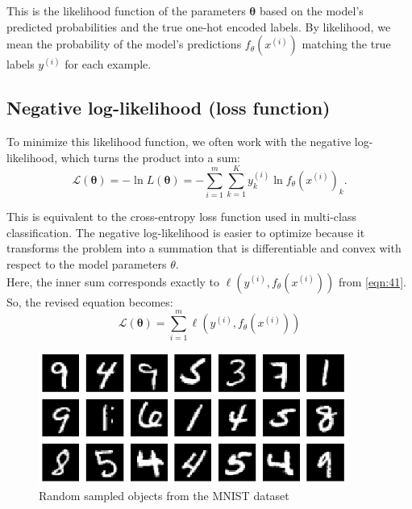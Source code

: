 This is the likelihood function of the parameters $\boldsymbol{\theta}$ based on the model's predicted probabilities and the true one-hot encoded labels. By likelihood, we mean the probability of the model's predictions $f_{\theta}(x^{(i)})$ matching the true labels $y^{(i)}$ for each example.

\subsection{Negative log-likelihood (loss function)}
To minimize this likelihood function, we often work with the negative log-likelihood, which turns the product into a sum:
\begin{equation}
    \mathcal{L}(\boldsymbol{\theta}) = -\ln L(\boldsymbol{\theta}) = - \sum_{i=1}^{m} \sum_{k=1}^{K}y_k^{(i)} \ln f_{\theta}(x^{(i)})_k.
    \label{eqn:54}
\end{equation}

This is equivalent to the cross-entropy loss function used in multi-class classification. The negative log-likelihood is easier to optimize because it transforms the problem into a summation that is differentiable and convex with respect to the model parameters $\theta$.\\

Here, the inner sum corresponds exactly to $\ell(y^{(i)}, f_{\theta}(x^{(i)}))$ from \ref{eqn:41}.\\

So, the revised equation becomes:
\begin{equation}
    \mathcal{L}(\boldsymbol{\theta}) = \sum_{i=1}^{m} \ell(y^{(i)}, f_{\theta}(x^{(i)}))
    \label{eqn:55}
\end{equation}

\begin{figure}[h!]
    \centering
    \includegraphics[width=0.9\textwidth]{images/figure8.png}
    \caption{Random sampled objects from the MNIST dataset}
    \label{fig:8}
\end{figure}


